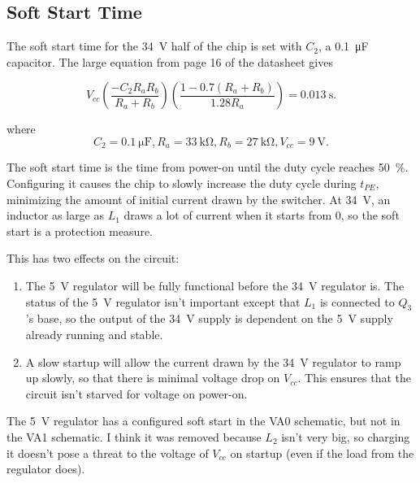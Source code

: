 \documentclass{article}
\newcommand{\Vcc}{$V_{cc}$}
\newcommand{\model}{\textsf}
\begin{document}
\subsection{Soft Start Time}
\label{sec:soft_start_time}
The soft start time for the \qty{34}{\volt} half of the chip is set
with $C_2$, a \qty{0.1}{\micro\farad} capacitor. The large equation
from page 16 of the datasheet gives

\begin{displaymath}
  V_{cc}\left(\frac{-C_2R_aR_b}{R_a+R_b}\right)\left(\frac{1-0.7(R_a+R_b)}{1.28R_a}\right)
  = \qty{0.013}{\second}.
\end{displaymath}

\noindent
where
\begin{displaymath}
  C_2 = \qty{0.1}{\micro\farad},R_a =
  \qty{33}{\kilo\ohm},R_b=\qty{27}{\kilo\ohm},V_{cc} = \qty{9}{\volt}.
\end{displaymath}

The soft start time is the time from power-on until the duty cycle
reaches \qty{50}{\%}. Configuring it causes the chip to slowly
increase the duty cycle during $t_{PE}$, minimizing the amount of
initial current drawn by the switcher. At \qty{34}{\volt}, an inductor
as large as $L_1$ draws a lot of current when it starts from 0, so the
soft start is a protection measure.

This has two effects on the circuit:

\begin{enumerate}
\item The \qty{5}{\volt} regulator will be fully functional before the
  \qty{34}{\volt} regulator is. The status of the \qty{5}{\volt}
  regulator isn't important except that $L_1$ is connected to $Q_3$'s
  base, so the output of the \qty{34}{\volt} supply is dependent on
  the \qty{5}{\volt} supply already running and stable.
\item A slow startup will allow the current drawn by the
  \qty{34}{\volt} regulator to ramp up slowly, so that there is
  minimal voltage drop on \Vcc{}. This ensures that the circuit isn't
  starved for voltage on power-on.
\end{enumerate}

The \qty{5}{\volt} regulator has a configured soft start in the
\model{VA0} schematic, but not in the \model{VA1} schematic. I think
it was removed because $L_2$ isn't very big, so charging it doesn't
pose a threat to the voltage of \Vcc{} on startup (even if the load
from the regulator does).
\end{document}
